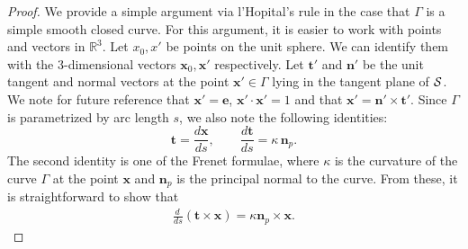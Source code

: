 \documentclass[final]{siamltex}
\begin{document}
\begin{proof}
 We provide a simple argument via l'Hopital's rule in the case that $\Gamma$ is a simple smooth closed curve. For this argument, it is easier  to work with points and vectors in $\mathbb{R}^3$. 
Let $x_0,x'$ be points on the unit sphere. We can identify them with the
3-dimensional vectors ${\mathbf x_0},{\mathbf x'}$ respectively.  Let
${\mathbf t}'$ and ${\mathbf n}'$ be the unit tangent and normal vectors
at the point ${\mathbf x}'  \in  \Gamma$ lying in the tangent plane
of ${\cal S}$.  We note for future reference that $\mathbf{x'}=\mathbf{e}$,
$\mathbf{x'} \cdot \mathbf{x'} = 1$ and that $\mathbf{x'} = \mathbf{n'}
\times \mathbf{t'}$. Since $\Gamma$ is parametrized by arc length $s$, we also note the following identities:
\[
   {\mathbf t} = \frac{d{\mathbf x}}{ds}, \qquad \frac{d{\mathbf t}}{ds} = \kappa \, {\mathbf n}_p .
\]
The second identity is one of the Frenet formulae, where $\kappa$ is the curvature of the curve $\Gamma$ at the point ${\mathbf x}$ and ${\mathbf n}_p$ is the principal normal to the curve. 
From these, it is straightforward to show that 
\begin{align*}
  \frac{d \, }{ds} \left( {\mathbf t} \times {\mathbf x} \right)=
  \kappa {\mathbf n}_p \times {\mathbf x} . 
\end{align*}


\end{proof}
\end{document}
